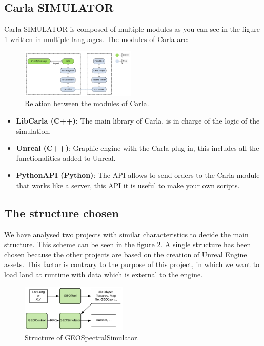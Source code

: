 \documentclass[10pt,a4paper,twocolumn,twoside]{article}
\begin{document}
\subsection{Carla SIMULATOR}

Carla SIMULATOR is composed of multiple modules as you can see in the figure \ref{fig-carlamodules} written in multiple languages. The modules of Carla are:

\begin{figure}[h]
  	\includegraphics[width=0.49\textwidth]{carlamodules}
	\caption{Relation between the modules of Carla.}
	\label{fig-carlamodules}
\end{figure}

\begin{itemize}
\setlength\itemsep{0em}
 \item \textbf{LibCarla (C++)}: The main library of Carla, is in charge of the logic of the simulation.
 \item \textbf{Unreal (C++)}: Graphic engine with the Carla plug-in, this includes all the functionalities added to Unreal.
 \item \textbf{PythonAPI (Python)}: The API allows to send orders to the Carla module that works like a server, this API it is useful to make your own scripts.
\end{itemize}

\subsection{The structure chosen}

We have analysed two projects with similar characteristics to decide the main structure. This scheme can be seen in the figure \ref{fig-dronsimulatormodules}. A single structure has been chosen because the other projects are based on the creation of Unreal Engine assets. This factor is contrary to the purpose of this project, in which we want to load land at runtime with data which is external to the engine.

\begin{figure}[h]
\centering
  	\includegraphics[width=0.45\textwidth]{structuretfg}
	\caption{Structure of GEOSpectralSimulator.}
	\label{fig-dronsimulatormodules}
\end{figure}
\end{document}
